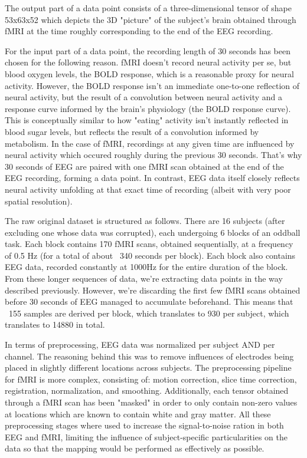 \documentclass{article}
\begin{document}
The output part of a data point consists of a three-dimensional tensor of shape 53x63x52 which depicts the 3D "picture" of the subject's brain obtained through fMRI at the time roughly corresponding to the end of the EEG recording.

For the input part of a data point, the recording length of 30 seconds has been chosen for the following reason. fMRI doesn't record neural activity per se, but blood oxygen levels, the BOLD response, which is a reasonable proxy for neural activity. However, the BOLD response isn't an immediate one-to-one reflection of neural activity, but the result of a convolution between neural activity and a response curve informed by the brain's physiology (the BOLD response curve). This is conceptually similar to how "eating" activity isn't instantly reflected in blood sugar levels, but reflects the result of a convolution informed by metabolism. In the case of fMRI, recordings at any given time are influenced by neural activity which occured roughly during the previous 30 seconds. That's why 30 seconds of EEG are paired with one fMRI scan obtained at the end of the EEG recording, forming a data point. In contrast, EEG data itself closely reflects neural activity unfolding at that exact time of recording (albeit with very poor spatial resolution).

The raw original dataset is structured as follows. There are 16 subjects (after excluding one whose data was corrupted), each undergoing 6 blocks of an oddball task. Each block contains 170 fMRI scans, obtained sequentially, at a frequency of 0.5 Hz (for a total of about ~340 seconds per block). Each block also contains EEG data, recorded constantly at 1000Hz for the entire duration of the block. From these longer sequences of data, we're extracting data points in the way described previously. However, we're discarding the first few fMRI scans obtained before 30 seconds of EEG managed to accumulate beforehand. This means that ~155 samples are derived per block, which translates to 930 per subject, which translates to 14880 in total.

In terms of preprocessing, EEG data was normalized per subject AND per channel. The reasoning behind this was to remove influences of electrodes being placed in slightly different locations across subjects. The preprocessing pipeline for fMRI is more complex, consisting of: motion correction, slice time correction, registration, normalization, and smoothing. Additionally, each tensor obtained through a fMRI scan has been "masked" in order to only contain non-zero values at locations which are known to contain white and gray matter. All these preprocessing stages where used to increase the signal-to-noise ration in both EEG and fMRI, limiting the influence of subject-specific particularities on the data so that the mapping would be performed as effectively as possible.
\end{document}
